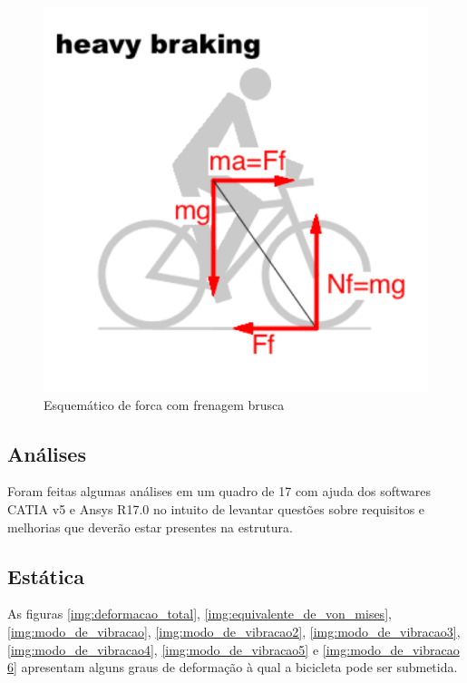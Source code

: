 \graphicspath{{figuras/}}
\begin{figure}[h!]
\centering
\includegraphics[scale=0.80]{esq_forca_com_frenagem_brusca.png}
\caption{Esquemático de forca com frenagem brusca}
\label{img:esq_forca_com_frenagem_brusca}
\end{figure}


	\subsection{Análises}
	Foram feitas algumas análises em um quadro de 17 com ajuda dos softwares CATIA v5 e Ansys R17.0 no intuito de levantar questões sobre requisitos e melhorias que deverão estar presentes na estrutura.
	
	\subsection{Estática}
	As figuras \ref{img:deformacao_total}, \ref{img:equivalente_de_von_mises}, \ref{img:modo_de_vibracao}, \ref{img:modo_de_vibracao2}, \ref{img:modo_de_vibracao3}, \ref{img:modo_de_vibracao4}, \ref{img:modo_de_vibracao5} e \ref{img:modo_de_vibracao 6} apresentam alguns graus de deformação à qual a bicicleta pode ser submetida. 	
	
